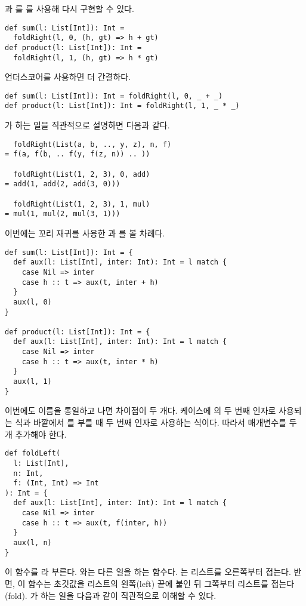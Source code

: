 과 를 를 사용해 다시 구현할 수 있다.

\begin{verbatim}
def sum(l: List[Int]): Int =
  foldRight(l, 0, (h, gt) => h + gt)
def product(l: List[Int]): Int =
  foldRight(l, 1, (h, gt) => h * gt)
\end{verbatim}

언더스코어를 사용하면 더 간결하다.

\begin{verbatim}
def sum(l: List[Int]): Int = foldRight(l, 0, _ + _)
def product(l: List[Int]): Int = foldRight(l, 1, _ * _)
\end{verbatim}

가 하는 일을 직관적으로 설명하면 다음과 같다.

\begin{verbatim}
  foldRight(List(a, b, .., y, z), n, f)
= f(a, f(b, .. f(y, f(z, n)) .. ))

  foldRight(List(1, 2, 3), 0, add)
= add(1, add(2, add(3, 0)))

  foldRight(List(1, 2, 3), 1, mul)
= mul(1, mul(2, mul(3, 1)))
\end{verbatim}

이번에는 꼬리 재귀를 사용한 과 를 볼 차례다.

\begin{verbatim}
def sum(l: List[Int]): Int = {
  def aux(l: List[Int], inter: Int): Int = l match {
    case Nil => inter
    case h :: t => aux(t, inter + h)
  }
  aux(l, 0)
}

def product(l: List[Int]): Int = {
  def aux(l: List[Int], inter: Int): Int = l match {
    case Nil => inter
    case h :: t => aux(t, inter * h)
  }
  aux(l, 1)
}
\end{verbatim}

이번에도 이름을 통일하고 나면 차이점이 두 개다.  케이스에
의 두 번째 인자로 사용되는 식과  바깥에서 를 부를
때 두 번째 인자로 사용하는 식이다. 따라서 매개변수를 두 개 추가해야 한다.

\begin{verbatim}
def foldLeft(
  l: List[Int],
  n: Int,
  f: (Int, Int) => Int
): Int = {
  def aux(l: List[Int], inter: Int): Int = l match {
    case Nil => inter
    case h :: t => aux(t, f(inter, h))
  }
  aux(l, n)
}
\end{verbatim}

이 함수를 라 부른다. 와는 다른 일을 하는 함수다.
는 리스트를 오른쪽부터 접는다. 반면, 이 함수는 초깃값을 리스트의
왼쪽(left) 끝에 붙인 뒤 그쪽부터 리스트를 접는다(fold). 가 하는
일을 다음과 같이 직관적으로 이해할 수 있다.

